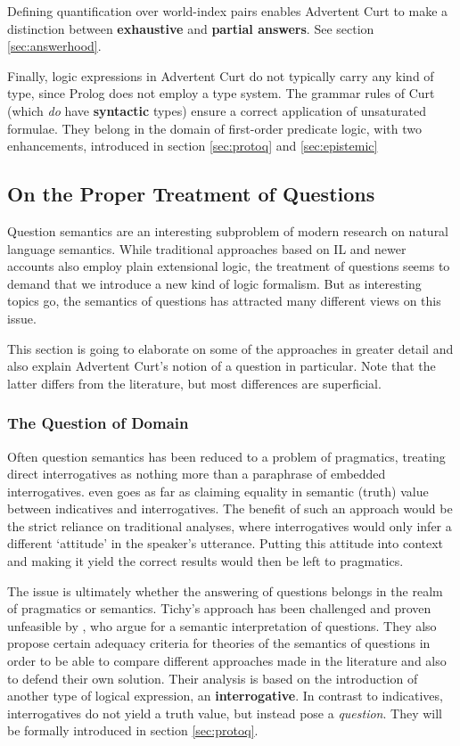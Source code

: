 \documentclass[a4paper]{article}
\newcommand{\abbr}{\textsf} %
\newcommand{\stress}{\textbf} %
\newcommand{\term}[1]{\textsf{\textbf{#1}}} %
\newcommand{\pn}{\textsf} %
\newcommand{\curt}{\pn{Curt}}
\newcommand{\acurt}{\pn{Advertent Curt}}
\newcommand{\prol}{\pn{Prolog}}
\theoremstyle{remark}
\theoremstyle{remark}
\theoremstyle{definition}
\theoremstyle{definition}
\begin{document}
Defining quantification over world-index pairs enables \acurt{} to make a
distinction between \term{exhaustive} and \term{partial answers}. See section
\ref{sec:answerhood}.

Finally, logic expressions in \acurt{} do not typically carry any kind of type,
since \prol{} does not employ a type system. The grammar rules of \curt{} (which
\emph{do} have \stress{syntactic} types) ensure a correct application of
unsaturated formulae. They belong in the domain of first-order predicate logic,
with two enhancements, introduced in section \ref{sec:protoq} and \ref{sec:epistemic}

\subsection{On the Proper Treatment of Questions}

Question semantics are an interesting subproblem of modern research on natural
language semantics. While traditional approaches based on \abbr{IL} and newer
accounts also employ plain extensional logic, %
the treatment
of questions seems to demand that we introduce a new kind of logic formalism.
But as interesting topics go, the semantics of questions has attracted many
different views on this issue.

This section is going to elaborate on some of the approaches in greater detail
and also explain \acurt's notion of a question in particular. Note that the
latter differs from the literature, but most differences are superficial.

\subsubsection{The Question of Domain}

Often question semantics has been reduced to a problem of
pragmatics, treating direct interrogatives as nothing more than a
paraphrase of embedded interrogatives.\cite{tichy}
even goes as far as claiming equality in semantic (truth) value between
indicatives and interrogatives. The benefit of such an approach would be the
strict reliance on traditional analyses, where interrogatives would only infer a
different `attitude' in the speaker's utterance. Putting this attitude into
context and making it yield the correct results would then be left to
pragmatics.

The issue is ultimately whether the answering of questions belongs in the realm
of pragmatics or semantics. Tichy's approach has been challenged and proven
unfeasible by \cite{gs:q}, who argue for a semantic interpretation of questions.
They also propose certain adequacy criteria for theories of the semantics of
questions in order to be able to compare different approaches made in the
literature and also to defend their own solution. Their analysis is based on the
introduction of another type of logical expression, an \term{interrogative}.
In contrast to indicatives, interrogatives do not yield a truth value, but
instead pose a \emph{question}. They will be formally introduced in section
\ref{sec:protoq}.
\end{document}
